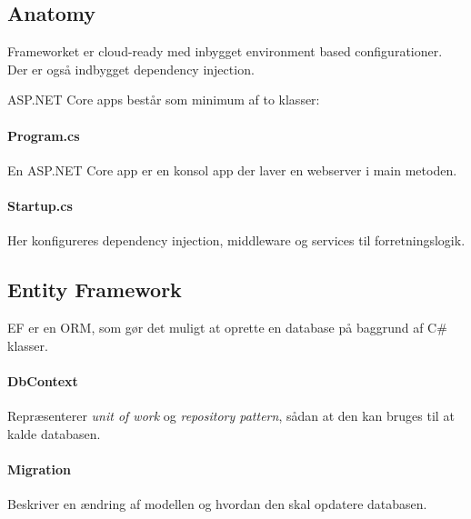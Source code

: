 \subsection{Anatomy}
Frameworket er cloud-ready med inbygget environment based configurationer. Der er også indbygget dependency injection.

ASP.NET Core apps består som minimum af to klasser:

\paragraph{Program.cs}
En ASP.NET Core app er en konsol app der laver en webserver i main metoden.

\paragraph{Startup.cs}
Her konfigureres dependency injection, middleware og services til forretningslogik.

\subsection{Entity Framework}
EF er en ORM, som gør det muligt at oprette en database på baggrund af C\# klasser.

\paragraph{DbContext}
Repræsenterer \textit{unit of work} og \textit{repository pattern}, sådan at den kan bruges til at kalde databasen.

\paragraph{Migration} Beskriver en ændring af modellen og hvordan den skal opdatere databasen.